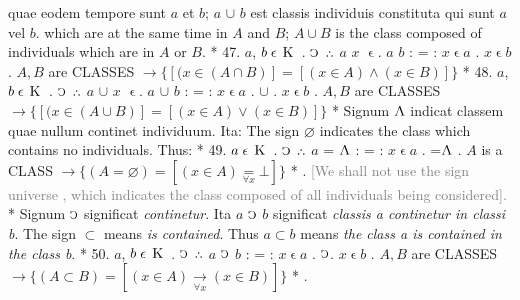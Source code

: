 \documentclass{book}
\newcommand{\C}{\mathop{\sbox0{$\displaystyle$$\reflectbox{C}$} %
\raisebox{-\height+\ht0-0.05cm}[\ht0][\dp0]{\scalebox{0.8}[0.8]{\copy0}}}\displaylimits} %
\newcommand{\pppNoSpace}{\leavevmode\lower0ex\hbox{.}\kern-0.1em\raise0.7ex\hbox{.}\kern-0.1em\lower0ex\hbox{.}} %
\newcommand{\abs}{\mathop{\rotatebox[origin=c]{180}{V}}}
\newcommand{\smallIn}{\ensuremath{\mathrel{\epsilon}}}
\newcommand{\K}{\mathop{\thinspace \text{K} \thinspace}}
\newcommand\irrelavent[1]{\textcolor{gray}{#1}}
\newenvironment{translateTwoCol}
               { %
                 \columnratio{0.5, 0.5} \begin{paracol}{2}
                 \newcommand{\LAT}{\switchcolumn[0]*}
                 \newcommand{\ENG}{\switchcolumn[1]}
               }
               { %
                 \let\ENG\undefined
                 \let\LAT\undefined
                 \end{paracol}
               }
\begin{document}
\begin{translateTwoCol}
quae eodem tempore sunt $a$ et $b$; $a$ $\cup$ $b$ est classis individuis constituta qui sunt $a$ vel $b$.
\ENG
which are at the same time in $A$ and $B$; $A \cup B$ is the class composed of individuals which are in $A$ or $B$.
\LAT
47. \hspace{0.67cm} $a$, $b \smallIn \K$ . $\C$ $\pppNoSpace$ $a$ $x$ \smallIn . $a$ $b$ : = : $x \smallIn a$ . $x \smallIn b$
\ENG
47. \hspace{0.67cm} $A, B$ are \scriptsize{CLASSES} \normalsize $\rightarrow \{[(x \in (A \cap B)] = [(x \in A) \wedge (x \in B)]\}$
\LAT
48. \hspace{0.67cm} $a$, $b \smallIn \K$ . $\C$ $\pppNoSpace$ $a$ $\cup$ $x$ \smallIn . $a$ $\cup$ $b$ : = : $x \smallIn a$ . $\cup$ . $x \smallIn b$
\ENG
48. \hspace{0.67cm} $A, B$ are \scriptsize{CLASSES} \normalsize $\rightarrow \{[(x \in (A \cup B)] = [(x \in A) \vee (x \in B)]\}$
\LAT
\quad Signum $\abs$ indicat classem quae nullum continet individuum. Ita:
\ENG
\quad The sign $\varnothing$ indicates the class which contains no individuals. Thus:
\LAT
49. \hspace{0.67cm} $a \smallIn \K$ . $\C$ $\pppNoSpace$ $a$ = $\abs$ : = : $x \smallIn a$ . =\scalebox{0.7}{$x$}\thinspace  $\abs$
\ENG
49. \hspace{0.67cm} $A$ is a \scriptsize{CLASS} \normalsize $\rightarrow \{(A= \varnothing) = [(x \in A) \underset{\forall x}= \bot]\}$ 
\LAT
{}.
\ENG
\quad \irrelavent{[We shall not use the sign \scriptsize{universe} \normalsize, which indicates the class composed of all individuals being considered].}
\LAT
\quad Signum $\C$ significat {\emph{continetur}}. Ita $a$ $\C$ $b$ significat {\emph{classis a continetur in classi b}}.
\ENG
\quad The sign $\subset$ means {\emph{is contained}}. Thus $a \subset b$ means {\emph{the class a is contained in the class b}}.
\LAT
50. \hspace{0.67cm} $a$, $b \smallIn \K$ . $\C$ $\pppNoSpace$ $a$ $\C$ $b$ : = : $x \smallIn a$ . $\C$\scalebox{0.7}{$x$}\thinspace . $x \smallIn b$
\ENG
50. \hspace{0.67cm} $A, B$ are \scriptsize{CLASSES} \normalsize $\rightarrow \{(A \subset B)=[(x\in A) \xrightarrow[\forall x]{} (x \in B)]\}$
\LAT
{}.

\end{translateTwoCol}
\end{document}
